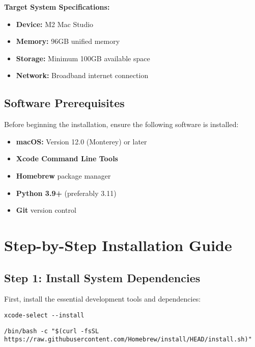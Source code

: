 \documentclass[11pt,a4paper]{article}
\begin{document}
\textbf{Target System Specifications:}
\begin{itemize}
    \item \textbf{Device:} M2 Mac Studio
    \item \textbf{Memory:} 96GB unified memory
    \item \textbf{Storage:} Minimum 100GB available space
    \item \textbf{Network:} Broadband internet connection
\end{itemize}

\subsection{Software Prerequisites}

Before beginning the installation, ensure the following software is installed:

\begin{itemize}
    \item \textbf{macOS:} Version 12.0 (Monterey) or later
    \item \textbf{Xcode Command Line Tools}
    \item \textbf{Homebrew} package manager
    \item \textbf{Python 3.9+} (preferably 3.11)
    \item \textbf{Git} version control
\end{itemize}

\section{Step-by-Step Installation Guide}

\subsection{Step 1: Install System Dependencies}

First, install the essential development tools and dependencies:

\begin{lstlisting}[style=bashstyle, caption={Install Xcode Command Line Tools}]
xcode-select --install
\end{lstlisting}

\begin{lstlisting}[style=bashstyle, caption={Install Homebrew}]
/bin/bash -c "$(curl -fsSL https://raw.githubusercontent.com/Homebrew/install/HEAD/install.sh)"
\end{lstlisting}
\end{document}

